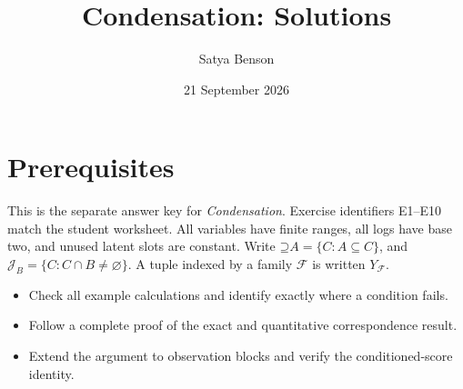 \documentclass[11pt]{article}
\title{Condensation: Solutions}
\author{Satya Benson}
\date{21 September 2026}
\newcommand{\Up}{\mathord{\supseteq}}
\begin{document}
\maketitle

\section{Prerequisites}
This is the separate answer key for \emph{Condensation}. Exercise identifiers
E1--E10 match the student worksheet. All variables have finite ranges, all logs
have base two, and unused latent slots are constant. Write
$\Up A=\{C:A\subseteq C\}$,
and $\mathcal{J}_B=\{C:C\cap B\ne\varnothing\}$.
A tuple indexed by a family $\mathcal{F}$ is written $Y_{\mathcal{F}}$.

\begin{learningoutcomes}
\begin{itemize}
\item Check all example calculations and identify exactly where a condition fails.
\item Follow a complete proof of the exact and quantitative correspondence result.
\item Extend the argument to observation blocks and verify the conditioned-score identity.
\end{itemize}
\end{learningoutcomes}
\end{document}
